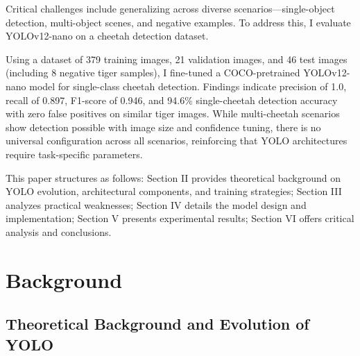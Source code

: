 \documentclass[conference]{IEEEtran}
\begin{document}
Critical challenges include generalizing across diverse scenarios—single-object detection, multi-object scenes, and negative examples. To address this, I evaluate YOLOv12-nano on a cheetah detection dataset.

Using a dataset of 379 training images, 21 validation images, and 46 test images (including 8 negative tiger samples), I fine-tuned a COCO-pretrained YOLOv12-nano model for single-class cheetah detection. Findings indicate precision of 1.0, recall of 0.897, F1-score of 0.946, and 94.6\% single-cheetah detection accuracy with zero false positives on similar tiger images. While multi-cheetah scenarios show detection possible with image size and confidence tuning, there is no universal configuration across all scenarios, reinforcing that YOLO architectures require task-specific parameters.

This paper structures as follows: Section II provides theoretical background on YOLO evolution, architectural components, and training strategies; Section III analyzes practical weaknesses; Section IV details the model design and implementation; Section V presents experimental results; Section VI offers critical analysis and conclusions.

\section{Background}

\subsection{Theoretical Background and Evolution of YOLO}
\end{document}
